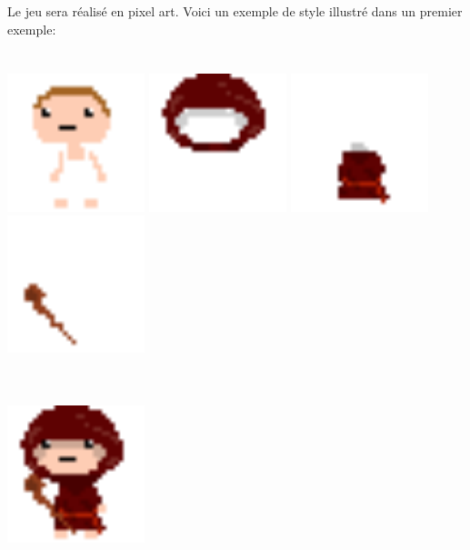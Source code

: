 \documentclass[16pt, oneside]{report}
\begin{document}
Le jeu sera r\'ealis\'e en pixel art.
Voici un exemple de style illustr\'e dans un premier exemple:\\
\\
\\
\includegraphics[width=0.3\textwidth]{character-base}
\includegraphics[width=0.3\textwidth]{character-head}
\includegraphics[width=0.3\textwidth]{character-robe}
\includegraphics[width=0.3\textwidth]{character-wand}
\\
\\
\\
\begin{center}
\includegraphics[width=0.3\textwidth]{character}
\end{center}
\end{document}
